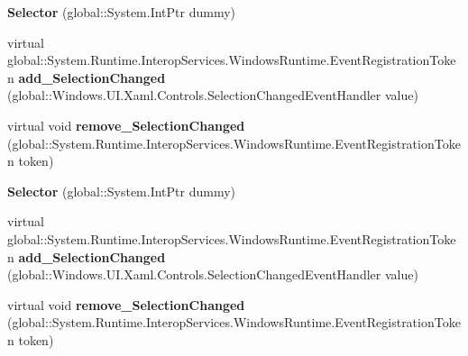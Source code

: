 \begin{DoxyCompactItemize}
\mbox{\label{class_windows_1_1_u_i_1_1_xaml_1_1_controls_1_1_primitives_1_1_selector_a4c0671da6b9b2fce8192909e4d622777}} 
{\bfseries Selector} (global\+::\+System.\+Int\+Ptr dummy)
\item 
\mbox{\label{class_windows_1_1_u_i_1_1_xaml_1_1_controls_1_1_primitives_1_1_selector_acd38c72f1d74ff86e39e3835f768b1b2}} 
virtual global\+::\+System.\+Runtime.\+Interop\+Services.\+Windows\+Runtime.\+Event\+Registration\+Token {\bfseries add\+\_\+\+Selection\+Changed} (global\+::\+Windows.\+U\+I.\+Xaml.\+Controls.\+Selection\+Changed\+Event\+Handler value)
\item 
\mbox{\label{class_windows_1_1_u_i_1_1_xaml_1_1_controls_1_1_primitives_1_1_selector_a2fc343b1044baa49806a7da0df01d46e}} 
virtual void {\bfseries remove\+\_\+\+Selection\+Changed} (global\+::\+System.\+Runtime.\+Interop\+Services.\+Windows\+Runtime.\+Event\+Registration\+Token token)
\item 
\mbox{\label{class_windows_1_1_u_i_1_1_xaml_1_1_controls_1_1_primitives_1_1_selector_a4c0671da6b9b2fce8192909e4d622777}} 
{\bfseries Selector} (global\+::\+System.\+Int\+Ptr dummy)
\item 
\mbox{\label{class_windows_1_1_u_i_1_1_xaml_1_1_controls_1_1_primitives_1_1_selector_acd38c72f1d74ff86e39e3835f768b1b2}} 
virtual global\+::\+System.\+Runtime.\+Interop\+Services.\+Windows\+Runtime.\+Event\+Registration\+Token {\bfseries add\+\_\+\+Selection\+Changed} (global\+::\+Windows.\+U\+I.\+Xaml.\+Controls.\+Selection\+Changed\+Event\+Handler value)
\item 
\mbox{\label{class_windows_1_1_u_i_1_1_xaml_1_1_controls_1_1_primitives_1_1_selector_a2fc343b1044baa49806a7da0df01d46e}} 
virtual void {\bfseries remove\+\_\+\+Selection\+Changed} (global\+::\+System.\+Runtime.\+Interop\+Services.\+Windows\+Runtime.\+Event\+Registration\+Token token)
\item 

\end{DoxyCompactItemize}

